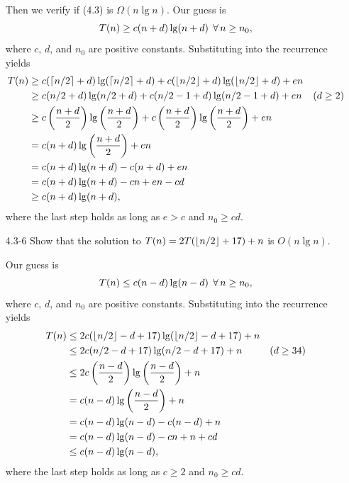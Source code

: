 \begin{enumerate}
\begin{framed}
Then we verify if (4.3) is $\Omega(n \lg n)$. Our guess is
\[
T(n) \ge c (n + d) \lg (n + d) \; \operatorname{\forall} n \ge n_0,
\]
where $c$, $d$, and $n_0$ are positive constants. Substituting into the
recurrence yields
\begin{equation*}
\begin{aligned}
T(n) &\ge c (\lceil n/2\rceil + d) \lg (\lceil n/2\rceil + d) + c (\lfloor n/2\rfloor + d) \lg (\lfloor n/2\rfloor + d) + en\\
     &\ge c (n/2 + d) \lg (n/2 + d) + c (n/2 - 1 + d) \lg (n/2 - 1 + d) + en & \text{($d \ge 2$)}\\
     &\ge c\left(\frac{n + d}{2}\right) \lg \left(\frac{n + d}{2}\right)
     + c\left(\frac{n + d}{2}\right) \lg\left(\frac{n + d}{2}\right) + en\\
     &= c (n + d) \lg \left(\frac{n + d}{2}\right) + en\\
     &= c (n + d) \lg (n + d) - c (n + d) + en\\
     &= c (n + d) \lg (n + d) - cn + en - cd\\
     &\ge c (n + d) \lg (n + d),
\end{aligned}
\end{equation*}
where the last step holds as long as $e > c$ and $n_0 \ge cd$.
\end{framed}

\newpage

\item[4.3{-}6]{Show that the solution to $T(n) = 2T(\lfloor n/2\rfloor + 17) + n$ is
$O(n \lg n)$.}

\begin{framed}
Our guess is
\[
T(n) \le c (n - d) \lg (n - d) \; \operatorname{\forall} n \ge n_0,
\]
where $c$, $d$, and $n_0$ are positive constants. Substituting into the
recurrence yields
\begin{equation*}
\begin{aligned}
T(n) &\le 2 c (\lfloor n/2\rfloor - d + 17) \lg (\lfloor n/2\rfloor - d + 17) + n\\
     &\le 2 c (n/2 - d + 17) \lg (n/2 - d + 17) + n & \text{($d \ge 34$)}\\
     &\le 2 c\left(\frac{n - d}{2}\right) \lg \left(\frac{n - d}{2}\right) + n\\
     &= c (n - d) \lg \left(\frac{n - d}{2}\right) + n\\
     &= c (n - d) \lg (n - d) - c (n - d) + n\\
     &= c (n - d) \lg (n - d) - cn + n + cd\\
     &\le c (n - d) \lg (n - d),
\end{aligned}
\end{equation*}
where the last step holds as long as $c \ge 2$ and $n_0 \ge cd$.
\end{framed}


\end{enumerate}
